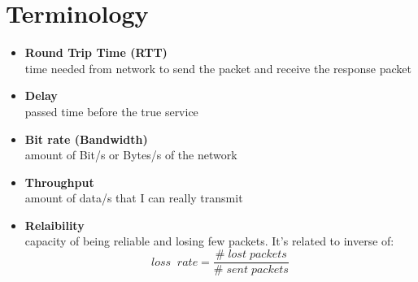 \section{Terminology}
\begin{itemize}
\item{\textbf{Round Trip Time (RTT)}\\
time needed from network to send the packet and receive the response packet
}
\item{\textbf{Delay}\\
passed time before the true service
}
\item{\textbf{Bit rate (Bandwidth)}\\
amount of Bit/s or Bytes/s of the network
}
\item{\textbf{Throughput}\\
amount of data/s that I can really transmit
}
\item{\textbf{Relaibility}\\
capacity of being reliable and losing few packets. It's related to inverse of:
$$loss\;\;rate = \frac{\#\;lost\;packets}{\#\;sent\;packets}$$
}
\end{itemize}

